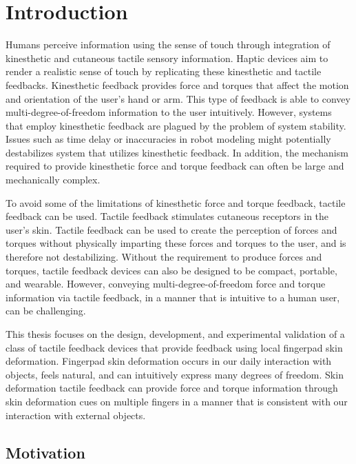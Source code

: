 \chapter{Introduction}

Humans perceive information using the sense of touch through integration of kinesthetic and cutaneous tactile sensory information. Haptic devices aim to render a realistic sense of touch by replicating these kinesthetic and tactile feedbacks. Kinesthetic feedback provides force and torques that affect the motion and orientation of the user's hand or arm.  This type of feedback is able to convey multi-degree-of-freedom information to the user intuitively. However, systems that employ kinesthetic feedback are plagued by the problem of system stability. Issues such as time delay or inaccuracies in robot modeling might potentially destabilizes system that utilizes kinesthetic feedback. In addition, the mechanism required to provide kinesthetic force and torque feedback can often be large and mechanically complex.

To avoid some of the limitations of kinesthetic force and torque feedback, tactile feedback can be used. Tactile feedback stimulates cutaneous receptors in the user's skin. Tactile feedback can be used to create the perception of forces and torques without physically imparting these forces and torques to the user, and is therefore not destabilizing. Without the requirement to produce forces and torques, tactile feedback devices can also be designed to be compact, portable, and wearable. However, conveying multi-degree-of-freedom force and torque information via tactile feedback, in a manner that is intuitive to a human user, can be challenging.

This thesis focuses on the design, development, and experimental validation of a class of tactile feedback devices that provide feedback using local fingerpad skin deformation. Fingerpad skin deformation occurs in our daily interaction with objects, feels natural, and can intuitively express many degrees of freedom. Skin deformation tactile feedback can provide force and torque information through skin deformation cues on multiple fingers in a manner that is consistent with our interaction with external objects.


\section{Motivation}

